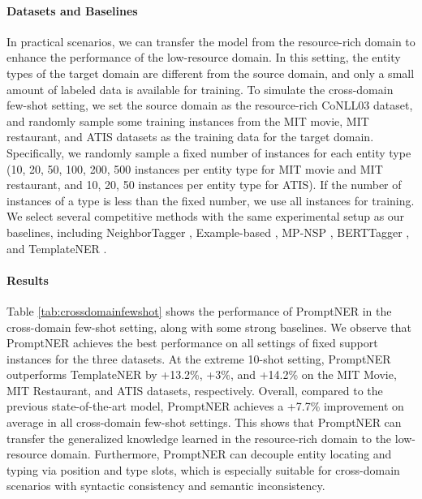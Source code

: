 \documentclass[11pt]{article}
\begin{document}
\paragraph{Datasets and Baselines}
In practical scenarios, we can transfer the model from the resource-rich domain to enhance the performance of the low-resource domain.
In this setting, the entity types of the target domain are different from the source domain, and only a small amount of labeled data is available for training. To simulate the cross-domain few-shot setting, we set the source domain as the resource-rich CoNLL03 dataset, and randomly sample some training instances from the MIT movie, MIT restaurant, and ATIS datasets as the training data for the target domain. Specifically, we randomly sample a fixed number of instances for each entity type (10, 20, 50, 100, 200, 500 instances per entity type for MIT movie and MIT restaurant, and 10, 20, 50 instances per entity type for ATIS). If the number of instances of a type is less than the fixed number, we use all instances for training. We select several competitive methods with the same experimental setup as our baselines, including NeighborTagger \citep{wiseman-stratos-2019-label}, Example-based \citep{ DBLP:journals/corr/abs-2008-10570}, MP-NSP \citep{huang-etal-2021-shot}, BERTTagger \citep{devlin-etal-2019-bert}, and TemplateNER \citep{ cui-etal-2021-template}.



\paragraph{Results}

Table \ref{tab:crossdomainfewshot} shows the performance of PromptNER in the cross-domain few-shot setting, along with some strong baselines. We observe that PromptNER achieves the best performance on all settings of fixed support instances for the three datasets. At the extreme 10-shot setting, PromptNER outperforms TemplateNER by +13.2\%, +3\%, and +14.2\% on the MIT Movie, MIT Restaurant, and ATIS datasets, respectively. Overall, compared to the previous state-of-the-art model, PromptNER achieves a +7.7\% improvement on average in all cross-domain few-shot settings. 
This shows that PromptNER can transfer the generalized knowledge learned in the resource-rich domain to the low-resource domain. Furthermore, PromptNER can decouple entity locating and typing via position and type slots, which is especially suitable for cross-domain scenarios with syntactic consistency and semantic inconsistency.
\end{document}
